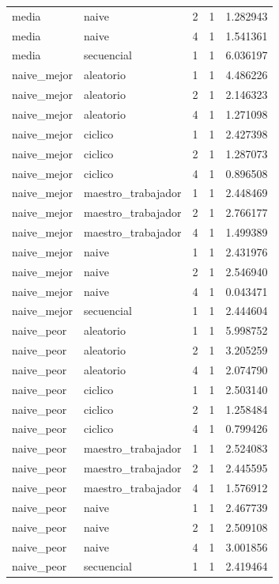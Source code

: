 \begin{longtable}{llrrr}
media & naive & 2 & 1 & 1.282943 \\
media & naive & 4 & 1 & 1.541361 \\
media & secuencial & 1 & 1 & 6.036197 \\
naive\_mejor & aleatorio & 1 & 1 & 4.486226 \\
naive\_mejor & aleatorio & 2 & 1 & 2.146323 \\
naive\_mejor & aleatorio & 4 & 1 & 1.271098 \\
naive\_mejor & ciclico & 1 & 1 & 2.427398 \\
naive\_mejor & ciclico & 2 & 1 & 1.287073 \\
naive\_mejor & ciclico & 4 & 1 & 0.896508 \\
naive\_mejor & maestro\_trabajador & 1 & 1 & 2.448469 \\
naive\_mejor & maestro\_trabajador & 2 & 1 & 2.766177 \\
naive\_mejor & maestro\_trabajador & 4 & 1 & 1.499389 \\
naive\_mejor & naive & 1 & 1 & 2.431976 \\
naive\_mejor & naive & 2 & 1 & 2.546940 \\
naive\_mejor & naive & 4 & 1 & 0.043471 \\
naive\_mejor & secuencial & 1 & 1 & 2.444604 \\
naive\_peor & aleatorio & 1 & 1 & 5.998752 \\
naive\_peor & aleatorio & 2 & 1 & 3.205259 \\
naive\_peor & aleatorio & 4 & 1 & 2.074790 \\
naive\_peor & ciclico & 1 & 1 & 2.503140 \\
naive\_peor & ciclico & 2 & 1 & 1.258484 \\
naive\_peor & ciclico & 4 & 1 & 0.799426 \\
naive\_peor & maestro\_trabajador & 1 & 1 & 2.524083 \\
naive\_peor & maestro\_trabajador & 2 & 1 & 2.445595 \\
naive\_peor & maestro\_trabajador & 4 & 1 & 1.576912 \\
naive\_peor & naive & 1 & 1 & 2.467739 \\
naive\_peor & naive & 2 & 1 & 2.509108 \\
naive\_peor & naive & 4 & 1 & 3.001856 \\
naive\_peor & secuencial & 1 & 1 & 2.419464 \\
\bottomrule
\end{longtable}
